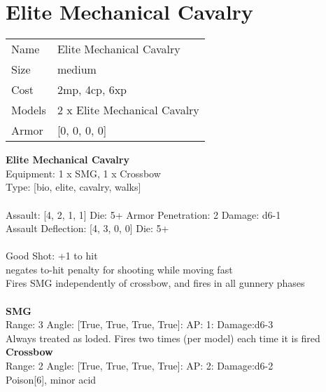 \pagebreak\pagebreak

\section{ Elite Mechanical Cavalry }

\begin{tabular}{ll}
  Name & Elite Mechanical Cavalry \\
  Size & medium\\
  Cost & 2mp, 4cp, 6xp\\
  Models & 2 x Elite Mechanical Cavalry\\
  Armor & [0, 0, 0, 0]\\
\end{tabular}

\noindent 

{\bf Elite Mechanical Cavalry } \\
Equipment: 1 x SMG, 1 x Crossbow \\
Type: [bio, elite, cavalry, walks] \\
\ \\
Assault: [4, 2, 1, 1] Die: 5+ Armor Penetration: 2 Damage: d6-1 \\
Assault Deflection: [4, 3, 0, 0] Die: 5+\\
\indent  
\ \\
Good Shot: +1 to hit\\ 
negates to-hit penalty for shooting while moving fast\\ 
Fires SMG independently of crossbow, and fires in all gunnery phases\\ 

\ \\
{\bf SMG } \\



Range: 3  Angle: [True, True, True, True]: AP: 1: Damage:d6-3 \\
Always treated as loded. Fires two times (per model) each time it is fired\\ 




{\bf Crossbow } \\



Range: 2  Angle: [True, True, True, True]: AP: 2: Damage:d6-2 \\
Poison[6], minor acid\\ 




